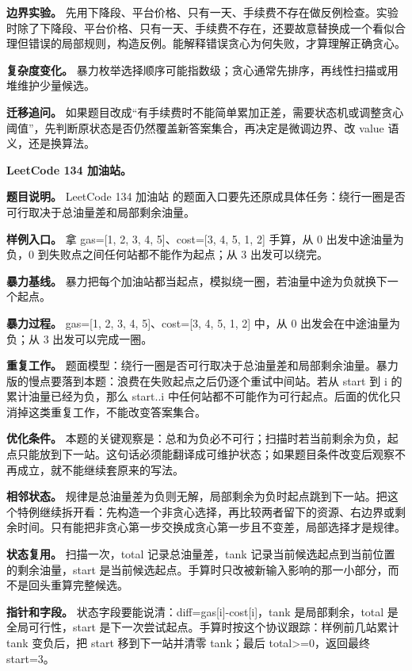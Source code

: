 \textbf{边界实验。} 先用下降段、平台价格、只有一天、手续费不存在做反例检查。实验时除了下降段、平台价格、只有一天、手续费不存在，还要故意替换成一个看似合理但错误的局部规则，构造反例。能解释错误贪心为何失败，才算理解正确贪心。

\textbf{复杂度变化。} 暴力枚举选择顺序可能指数级；贪心通常先排序，再线性扫描或用堆维护少量候选。

\textbf{迁移追问。} 如果题目改成“有手续费时不能简单累加正差，需要状态机或调整贪心阈值”，先判断原状态是否仍然覆盖新答案集合，再决定是微调边界、改 value 语义，还是换算法。

\noindent\textbf{LeetCode 134 加油站。}

\textbf{题目说明。} LeetCode 134 加油站 的题面入口要先还原成具体任务：绕行一圈是否可行取决于总油量差和局部剩余油量。

\textbf{样例入口。} 拿 gas=[1, 2, 3, 4, 5]、cost=[3, 4, 5, 1, 2] 手算，从 0 出发中途油量为负，0 到失败点之间任何站都不能作为起点；从 3 出发可以绕完。

\textbf{暴力基线。} 暴力把每个加油站都当起点，模拟绕一圈，若油量中途为负就换下一个起点。

\textbf{暴力过程。} gas=[1, 2, 3, 4, 5]、cost=[3, 4, 5, 1, 2] 中，从 0 出发会在中途油量为负；从 3 出发可以完成一圈。

\textbf{重复工作。} 题面模型：绕行一圈是否可行取决于总油量差和局部剩余油量。暴力版的慢点要落到本题：浪费在失败起点之后仍逐个重试中间站。若从 start 到 i 的累计油量已经为负，那么 start..i 中任何站都不可能作为可行起点。后面的优化只消掉这类重复工作，不能改变答案集合。

\textbf{优化条件。} 本题的关键观察是：总和为负必不可行；扫描时若当前剩余为负，起点只能放到下一站。这句话必须能翻译成可维护状态；如果题目条件改变后观察不再成立，就不能继续套原来的写法。

\textbf{相邻状态。} 规律是总油量差为负则无解，局部剩余为负时起点跳到下一站。把这个特例继续拆开看：先构造一个非贪心选择，再比较两者留下的资源、右边界或剩余时间。只有能把非贪心第一步交换成贪心第一步且不变差，局部选择才是规律。

\textbf{状态复用。} 扫描一次，total 记录总油量差，tank 记录当前候选起点到当前位置的剩余油量，start 是当前候选起点。手算时只改被新输入影响的那一小部分，而不是回头重算完整候选。

\textbf{指针和字段。} 状态字段要能说清：diff=gas[i]-cost[i]，tank 是局部剩余，total 是全局可行性，start 是下一次尝试起点。手算时按这个协议跟踪：样例前几站累计 tank 变负后，把 start 移到下一站并清零 tank；最后 total>=0，返回最终 start=3。

